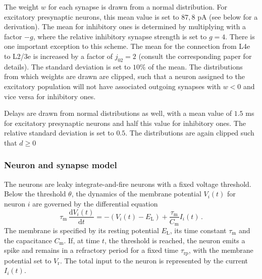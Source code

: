 The weight $w$ for each synapse is drawn from a normal distribution.
For excitatory presynaptic neurons, this mean value is set to $87,8$ pA (see below for 
a derivation). The mean for inhibitory ones is determined by multiplying 
with a factor $-g$, where the relative inhibitory synapse strength is set to 
$g = 4$. There is one important exception to this scheme.
The mean for the connection from L4e to L2/3e is increased by a factor of 
$j_{02} = 2$ (consult the corresponding paper \cite{potjans2014} for details). 
The standard deviation is set to $10\%$ of the mean. 
The distributions from which weights are drawn are clipped, 
such that a neuron assigned to the excitatory 
population will not have associated outgoing synapses with $w < 0$ 
and vice versa for inhibitory ones. 

Delays are drawn from normal distributions as well, with a mean value 
of $1.5$ ms for excitatory presynaptic neurons and half this value for 
inhibitory ones. The relative standard deviation is set to $0.5$. The distributions
are again clipped such that $d \ge 0$

\subsubsection{Neuron and synapse model}
The neurons are leaky integrate-and-fire neurons with a fixed voltage threshold. 
Below the threshold $\theta$, the dynamics of the membrane potential $V_i(t)$ 
for neuron $i$ are governed by the differential equation 
\begin{equation}
    \tau_\text{m} \,\frac{\text{d} V_i(t)}{\text{d} t} 
            = -(V_i(t) - E_\text{L}) + \frac{\tau_\text{m}}{C_\text{m}} I_i(t) \, .
    \label{eq:leaky_integrator}
\end{equation}
The membrane is specified by its resting potential $E_\text{L}$, 
its time constant $\tau_\text{m}$ and the capacitance $C_\text{m}$.
If, at time $t$, the threshold is reached, the neuron emits a spike and remains 
in a refractory period for a fixed time $\tau_\text{rp}$, with the membrane 
potential set to $V_\text{r}$. The total input to the neuron is represented by 
the current $I_i(t)$. 

